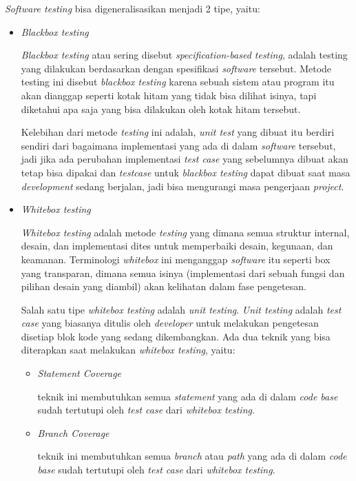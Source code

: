\documentclass[a4paper]{article}
\begin{document}
\textit{Software testing} bisa digeneralisasikan menjadi 2 tipe, yaitu:
\begin{itemize}
    \item \textit{Blackbox testing}

        \textit{Blackbox testing} atau sering disebut \textit{specification-based testing}, adalah testing yang dilakukan berdasarkan dengan spesifikasi \textit{software} tersebut. Metode testing ini disebut \textit{blackbox testing} karena sebuah sistem atau program itu akan dianggap seperti kotak hitam yang tidak bisa dilihat isinya, tapi diketahui apa saja yang bisa dilakukan oleh kotak hitam tersebut\autocite{jorgensen2018software}.

        Kelebihan dari metode \textit{testing} ini adalah, \textit{unit test} yang dibuat itu berdiri sendiri dari bagaimana implementasi yang ada di dalam \textit{software} tersebut, jadi jika ada perubahan implementasi \textit{test case} yang sebelumnya dibuat akan tetap bisa dipakai dan \textit{testcase} untuk \textit{blackbox testing} dapat dibuat saat masa \textit{development} sedang berjalan, jadi bisa mengurangi masa pengerjaan \textit{project}\autocite{jorgensen2018software}.


    \item \textit{Whitebox testing}

        \textit{Whitebox testing} adalah metode \textit{testing} yang dimana semua struktur internal, desain, dan implementasi dites untuk memperbaiki desain, kegunaan, dan keamanan. Terminologi \textit{whitebox} ini menganggap \textit{software} itu seperti box yang transparan, dimana semua isinya (implementasi dari sebuah fungsi dan pilihan desain yang diambil) akan kelihatan dalam fase pengetesan\autocite{guru99-whitebox-testing}.

        Salah satu tipe \textit{whitebox testing} adalah \textit{unit testing}. \textit{Unit testing} adalah \textit{test case} yang biasanya ditulis oleh \textit{developer} untuk melakukan pengetesan disetiap blok kode yang sedang dikembangkan\autocite{guru99-whitebox-testing}. Ada dua teknik yang bisa diterapkan saat melakukan \textit{whitebox testing}, yaitu:
        \begin{itemize}
            \item \textit{Statement Coverage}

            teknik ini membutuhkan semua \textit{statement} yang ada di dalam \textit{code base} sudah tertutupi oleh \textit{test case} dari \textit{whitebox testing}.
 
            \item \textit{Branch Coverage}

            teknik ini membutuhkan semua \textit{branch} atau \textit{path} yang ada di dalam \textit{code base} sudah tertutupi oleh \textit{test case} dari \textit{whitebox testing}.
        \end{itemize}
\end{itemize}
\end{document}
